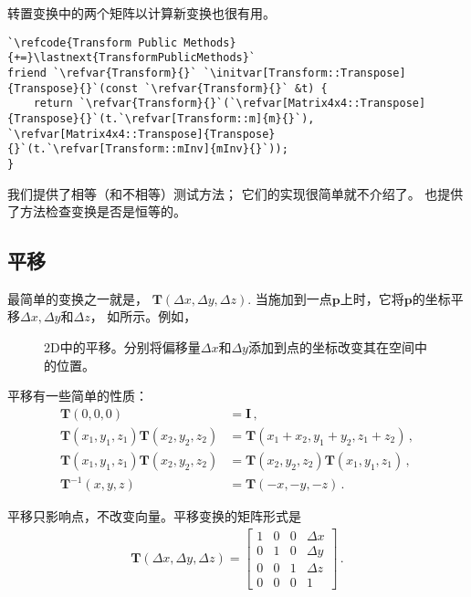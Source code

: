 转置变换中的两个矩阵以计算新变换也很有用。
\begin{lstlisting}
`\refcode{Transform Public Methods}{+=}\lastnext{TransformPublicMethods}`
friend `\refvar{Transform}{}` `\initvar[Transform::Transpose]{Transpose}{}`(const `\refvar{Transform}{}` &t) {
    return `\refvar{Transform}{}`(`\refvar[Matrix4x4::Transpose]{Transpose}{}`(t.`\refvar[Transform::m]{m}{}`), `\refvar[Matrix4x4::Transpose]{Transpose}{}`(t.`\refvar[Transform::mInv]{mInv}{}`));
}
\end{lstlisting}

我们提供了相等（和不相等）测试方法；
它们的实现很简单就不介绍了。
也提供了方法{}检查变换是否是恒等的。

\subsection{平移}\label{sub:平移}
最简单的变换之一就是，
$\bm T(\Delta x,\Delta y, \Delta z)$.
当施加到一点$\bm p$上时，它将$\bm p$的坐标平移$\Delta x,\Delta y$和$\Delta z$，
如所示。例如，
\begin{figure}[htbp]
    \centering
    \caption{2D中的平移。分别将偏移量$\Delta x$和$\Delta y$添加到点的坐标改变其在空间中的位置。}
    \label{fig:2.10}
\end{figure}

平移有一些简单的性质：
\begin{align*}
    \bm T(0,0,0)                         & =\bm I\, ,                                \\
    \bm T(x_1,y_1,z_1)\bm T(x_2,y_2,z_2) & =\bm T(x_1+x_2,y_1+y_2,z_1+z_2)\, ,       \\
    \bm T(x_1,y_1,z_1)\bm T(x_2,y_2,z_2) & =\bm T(x_2,y_2,z_2)\bm T(x_1,y_1,z_1)\, , \\
    \bm T^{-1}(x,y,z)                    & =\bm T(-x,-y,-z)\, .
\end{align*}

平移只影响点，不改变向量。平移变换的矩阵形式是
\begin{align*}
    \bm T(\Delta x,\Delta y, \Delta z)=\left[
        \begin{array}{cccc}
            1 & 0 & 0 & \Delta x \\
            0 & 1 & 0 & \Delta y \\
            0 & 0 & 1 & \Delta z \\
            0 & 0 & 0 & 1
        \end{array}
        \right]\, .
\end{align*}

